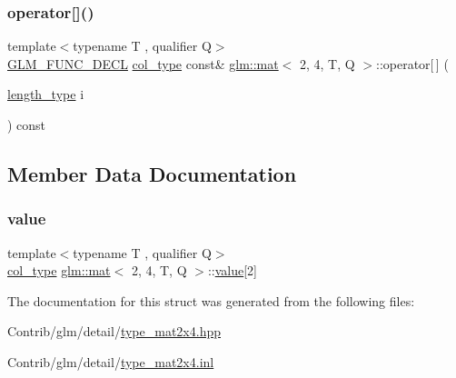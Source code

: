 \mbox{\label{structglm_1_1mat_3_012_00_014_00_01_t_00_01_q_01_4_af5ccda8342646f7dea9fec3ed9088607}} 
\subsubsection{\texorpdfstring{operator[]()}{operator[]()}\hspace{0.1cm}{\footnotesize\ttfamily [2/2]}}
{\footnotesize\ttfamily template$<$typename T , qualifier Q$>$ \\
\mbox{\hyperlink{setup_8hpp_ab2d052de21a70539923e9bcbf6e83a51}{G\+L\+M\+\_\+\+F\+U\+N\+C\+\_\+\+D\+E\+CL}} \mbox{\hyperlink{structglm_1_1mat_3_012_00_014_00_01_t_00_01_q_01_4_ae14ad10a9d8ce3908ec89ae373a27872}{col\+\_\+type}} const\& \mbox{\hyperlink{structglm_1_1mat}{glm\+::mat}}$<$ 2, 4, T, Q $>$\+::operator\mbox{[}$\,$\mbox{]} (\begin{DoxyParamCaption}\item[{\mbox{\hyperlink{structglm_1_1mat_3_012_00_014_00_01_t_00_01_q_01_4_a5295c484627e965d615f3367c2ca45d8}{length\+\_\+type}}}]{i }\end{DoxyParamCaption}) const}



\subsection{Member Data Documentation}
\mbox{\label{structglm_1_1mat_3_012_00_014_00_01_t_00_01_q_01_4_af1b1c45fac74697c901db6f2909b24f3}} 
\subsubsection{\texorpdfstring{value}{value}}
{\footnotesize\ttfamily template$<$typename T , qualifier Q$>$ \\
\mbox{\hyperlink{structglm_1_1mat_3_012_00_014_00_01_t_00_01_q_01_4_ae14ad10a9d8ce3908ec89ae373a27872}{col\+\_\+type}} \mbox{\hyperlink{structglm_1_1mat}{glm\+::mat}}$<$ 2, 4, T, Q $>$\+::\mbox{\hyperlink{_s_d_l__opengl__glext_8h_a8ad81492d410ff2ac11f754f4042150f}{value}}\mbox{[}2\mbox{]}\hspace{0.3cm}{\ttfamily [private]}}



The documentation for this struct was generated from the following files\+:\begin{DoxyCompactItemize}
\item 
Contrib/glm/detail/\mbox{\hyperlink{type__mat2x4_8hpp}{type\+\_\+mat2x4.\+hpp}}\item 
Contrib/glm/detail/\mbox{\hyperlink{type__mat2x4_8inl}{type\+\_\+mat2x4.\+inl}}\end{DoxyCompactItemize}
